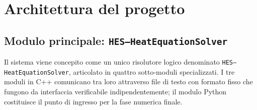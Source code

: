 \documentclass[a4paper,12pt]{article}
\begin{document}
\newpage
\section{Architettura del progetto}

\subsection*{Modulo principale: \texttt{HES--HeatEquationSolver}}

Il sistema viene concepito come un unico risolutore logico denominato \texttt{HES--HeatEquationSolver}, articolato in quattro sotto-moduli specializzati. I tre moduli in C++ comunicano tra loro attraverso file di testo con formato fisso che fungono da interfaccia verificabile indipendentemente; il modulo Python costituisce il punto di ingresso per la fase numerica finale.
\end{document}
